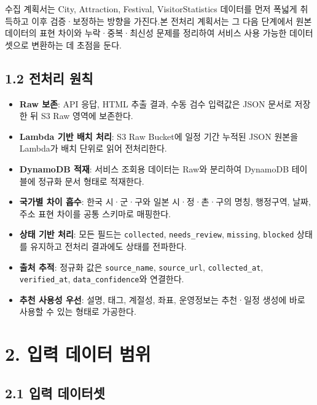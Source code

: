 \documentclass[12pt,a4paper]{article}
\newcommand{\DocNeedspace}[1]{\par\ifdim\dimexpr\pagegoal-\pagetotal\relax<#1\newpage\fi}
\begin{document}
\DocNeedspace{3\baselineskip}
수집 계획서는 City, Attraction, Festival, VisitorStatistics 데이터를 먼저 폭넓게 취득하고 이후 검증·보정하는 방향을 가진다.\newline 본 전처리 계획서는 그 다음 단계에서 원본 데이터의 표현 차이와 누락·중복·최신성 문제를 정리하여 서비스 사용 가능한 데이터셋으로 변환하는 데 초점을 둔다.


\DocNeedspace{24\baselineskip}
\subsection*{1.2 전처리 원칙}


\begin{itemize}
\item \textbf{Raw 보존}: API 응답, HTML 추출 결과, 수동 검수 입력값은 JSON 문서로 저장한 뒤 S3 Raw 영역에 보존한다.
\item \textbf{Lambda 기반 배치 처리}: S3 Raw Bucket에 일정 기간 누적된 JSON 원본을 Lambda가 배치 단위로 읽어 전처리한다.
\item \textbf{DynamoDB 적재}: 서비스 조회용 데이터는 Raw와 분리하여 DynamoDB 테이블에 정규화 문서 형태로 적재한다.
\item \textbf{국가별 차이 흡수}: 한국 시·군·구와 일본 시·정·촌·구의 명칭, 행정구역, 날짜, 주소 표현 차이를 공통 스키마로 매핑한다.
\item \textbf{상태 기반 처리}: 모든 필드는 \texttt{collected}, \texttt{needs\_\allowbreak{}review}, \texttt{missing}, \texttt{blocked} 상태를 유지하고 전처리 결과에도 상태를 전파한다.
\item \textbf{출처 추적}: 정규화 값은 \texttt{source\_\allowbreak{}name}, \texttt{source\_\allowbreak{}url}, \texttt{collected\_\allowbreak{}at}, \texttt{verified\_\allowbreak{}at}, \texttt{data\_\allowbreak{}confidence}와 연결한다.
\item \textbf{추천 사용성 우선}: 설명, 태그, 계절성, 좌표, 운영정보는 추천·일정 생성에 바로 사용할 수 있는 형태로 가공한다.
\end{itemize}


\newpage

\DocNeedspace{10\baselineskip}
\section*{2. 입력 데이터 범위}


\DocNeedspace{8\baselineskip}
\subsection*{2.1 입력 데이터셋}
\end{document}
